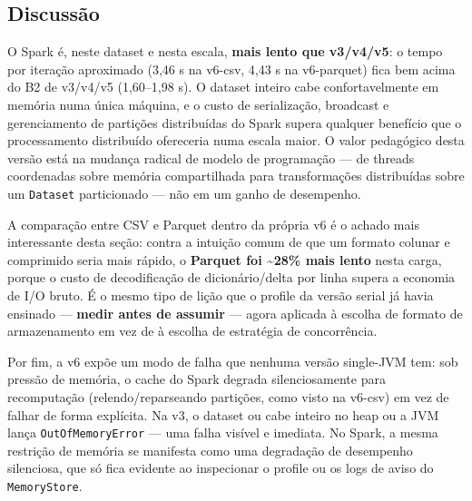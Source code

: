 \subsection{Discussão}

O Spark é, neste dataset e nesta escala, \textbf{mais lento que
v3/v4/v5}: o tempo por iteração aproximado (3,46 s na v6-csv, 4,43 s na
v6-parquet) fica bem acima do B2 de v3/v4/v5 (1,60--1,98 s). O dataset
inteiro cabe confortavelmente em memória numa única máquina, e o custo
de serialização, broadcast e gerenciamento de partições distribuídas do
Spark supera qualquer benefício que o processamento distribuído
ofereceria numa escala maior. O valor pedagógico desta versão está na
mudança radical de modelo de programação --- de threads coordenadas
sobre memória compartilhada para transformações distribuídas sobre um
\texttt{Dataset} particionado --- não em um ganho de desempenho.

A comparação entre CSV e Parquet dentro da própria v6 é o achado mais
interessante desta seção: contra a intuição comum de que um formato
colunar e comprimido seria mais rápido, o \textbf{Parquet foi
\textasciitilde28\% mais lento} nesta carga, porque o custo de
decodificação de dicionário/delta por linha supera a economia de
I/O bruto. É o mesmo tipo de lição que o profile da versão serial já
havia ensinado --- \textbf{medir antes de assumir} --- agora aplicada à
escolha de formato de armazenamento em vez de à escolha de estratégia de
concorrência.

Por fim, a v6 expõe um modo de falha que nenhuma versão single-JVM tem:
sob pressão de memória, o cache do Spark degrada silenciosamente para
recomputação (relendo/reparseando partições, como visto na v6-csv) em
vez de falhar de forma explícita. Na v3, o dataset ou cabe inteiro no
heap ou a JVM lança \texttt{OutOfMemoryError} --- uma falha visível e
imediata. No Spark, a mesma restrição de memória se manifesta como uma
degradação de desempenho silenciosa, que só fica evidente ao inspecionar
o profile ou os logs de aviso do \texttt{MemoryStore}.
